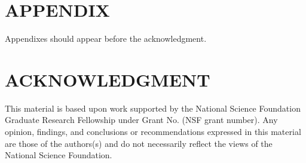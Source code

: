 \documentclass[letterpaper, 10 pt, conference]{ieeeconf}  %
\begin{document}

\section*{APPENDIX}

Appendixes should appear before the acknowledgment.

\section*{ACKNOWLEDGMENT}

This material is based upon work supported by the National Science Foundation Graduate Research Fellowship under Grant No. (NSF grant number). Any opinion, findings, and conclusions or recommendations expressed in this material are those of the authors(s) and do not necessarily reflect the views of the National Science Foundation.



\end{document}
